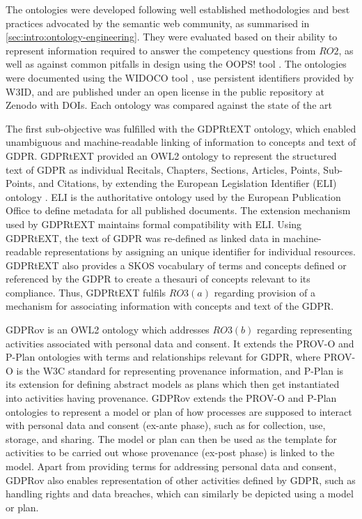 The ontologies were developed following well established methodologies \cite{noy_ontology_2001,suarez-figueroa_neon_2012,de_nicola_lightweight_2016} and best practices advocated by the semantic web community, as summarised in \autoref{sec:intro:ontology-engineering}.
They were evaluated based on their ability to represent information required to answer the competency questions \cite{noy_ontology_2001} from $RO2$, as well as against common pitfalls in design using the OOPS! tool \cite{poveda-villalon_oops!_2014}.
The ontologies were documented using the WIDOCO tool \cite{garijo_widoco:_2017}, use persistent identifiers provided by W3ID, and are published under an open license in the public repository at Zenodo with DOIs.
Each ontology was compared against the state of the art 

The first sub-objective was fulfilled with the GDPRtEXT ontology, which enabled unambiguous and machine-readable linking of information to concepts and text of GDPR. GDPRtEXT provided an OWL2 ontology to represent the structured text of GDPR as individual Recitals, Chapters, Sections, Articles, Points, Sub-Points, and Citations, by extending the European Legislation Identifier (ELI) ontology \cite{noauthor_council_2012}. ELI is the authoritative ontology used by the European Publication Office to define metadata for all published documents. The extension mechanism used by GDPRtEXT maintains formal compatibility with ELI. Using GDPRtEXT, the text of GDPR was re-defined as linked data in machine-readable representations by assigning an unique identifier for individual resources. GDPRtEXT also provides a SKOS vocabulary of terms and concepts defined or referenced by the GDPR to create a thesauri of concepts relevant to its compliance. Thus, GDPRtEXT fulfils $RO3(a)$ regarding provision of a mechanism for associating information with concepts and text of the GDPR.

GDPRov is an OWL2 ontology which addresses $RO3(b)$ regarding representing activities associated with personal data and consent. It extends the PROV-O \cite{lebo_prov-o:_2013} and P-Plan \cite{garijo_p-plan_2014} ontologies with terms and relationships relevant for GDPR, where PROV-O is the W3C standard for representing provenance information, and P-Plan is its extension for defining abstract models as plans which then get instantiated into activities having provenance. GDPRov extends the PROV-O and P-Plan ontologies to represent a model or plan of how processes are supposed to interact with personal data and consent (ex-ante phase), such as for collection, use, storage, and sharing. The model or plan can then be used as the template for activities to be carried out whose provenance (ex-post phase) is linked to the model. Apart from providing terms for addressing personal data and consent, GDPRov also enables representation of other activities defined by GDPR, such as handling rights and data breaches, which can similarly be depicted using a model or plan.

